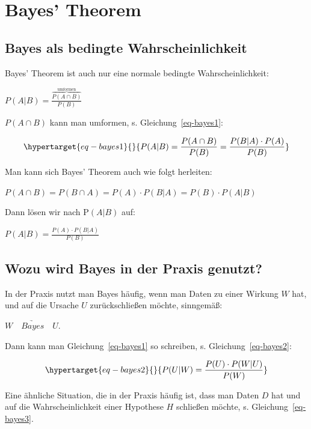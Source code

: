 \documentclass[
  a4paper,
  DIV=11]{scrreprt}
\theoremstyle{definition}
\theoremstyle{remark}
\begin{document}
\hypertarget{bayes-theorem}{%
\section{Bayes' Theorem}\label{bayes-theorem}}

\hypertarget{bayes-als-bedingte-wahrscheinlichkeit}{%
\subsection{Bayes als bedingte
Wahrscheinlichkeit}\label{bayes-als-bedingte-wahrscheinlichkeit}}

Bayes' Theorem ist auch nur eine normale bedingte Wahrscheinlichkeit:

\(P(A|B) = \frac{\overbrace{ P(A\cap B)}^\text{umformen}}{P(B)}\)

\(P(A\cap B)\) kann man umformen, s. Gleichung~\ref{eq-bayes1}:

\begin{equation}\protect\hypertarget{eq-bayes1}{}{P(A|B) =\frac{P(A\cap B)}{P(B)} = \frac{P(B|A) \cdot P(A)}{P(B)}}\label{eq-bayes1}\end{equation}

Man kann sich Bayes' Theorem auch wie folgt herleiten:

\(P(A\cap B) = P(B \cap A) = P(A) \cdot P(B|A) = P(B) \cdot P(A|B)\)

Dann lösen wir nach P\((A|B)\) auf:

\(P(A|B) = \frac{P(A) \cdot P(B|A)}{P(B)}\)

\hypertarget{wozu-wird-bayes-in-der-praxis-genutzt}{%
\subsection{Wozu wird Bayes in der Praxis
genutzt?}\label{wozu-wird-bayes-in-der-praxis-genutzt}}

In der Praxis nutzt man Bayes häufig, wenn man Daten zu einer Wirkung
\(W\) hat, und auf die Ursache \(U\) zurückschließen möchte, sinngemäß:

\(W \quad \underrightarrow{Bayes} \quad U\).

Dann kann man Gleichung~\ref{eq-bayes1} so schreiben, s.
Gleichung~\ref{eq-bayes2}:

\begin{equation}\protect\hypertarget{eq-bayes2}{}{P(U|W) = \frac{ P(U) \cdot P(W|U) }{P(W)}}\label{eq-bayes2}\end{equation}

Eine ähnliche Situation, die in der Praxis häufig ist, dass man Daten
\(D\) hat und auf die Wahrscheinlichkeit einer Hypothese \(H\) schließen
möchte, s. Gleichung~\ref{eq-bayes3}.
\end{document}
